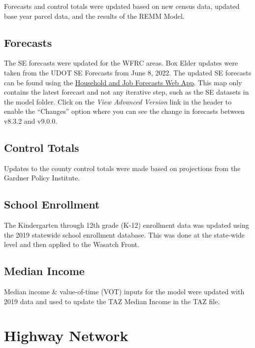\documentclass[
  letterpaper,
  DIV=11,
  numbers=noendperiod,
  titlepage=false]{scrreprt}
\begin{document}
Forecasts and control totals were updated based on new census data,
updated base year parcel data, and the results of the REMM Model.

\hypertarget{forecasts}{%
\subsection{Forecasts}\label{forecasts}}

The SE forecasts were updated for the WFRC areas. Box Elder updates were
taken from the UDOT SE Forecasts from June 8, 2022. The updated SE
forecasts can be found using the
\href{https://wfrc.org/household-job-forecast-map}{Household and Job
Forecasts Web App}. This map only contains the latest forecast and not
any iterative step, such as the SE datasets in the model folder. Click
on the \emph{View Advanced Version} link in the header to enable the
``Changes'' option where you can see the change in forecasts between
v8.3.2 and v9.0.0.

\hypertarget{control-totals}{%
\subsection{Control Totals}\label{control-totals}}

Updates to the county control totals were made based on projections from
the Gardner Policy Institute.

\hypertarget{school-enrollment}{%
\subsection{School Enrollment}\label{school-enrollment}}

The Kindergarten through 12th grade (K-12) enrollment data was updated
using the 2019 statewide school enrollment database. This was done at
the state-wide level and then applied to the Wasatch Front.

\hypertarget{median-income}{%
\subsection{Median Income}\label{median-income}}

Median income \& value-of-time (VOT) inputs for the model were updated
with 2019 data and used to update the TAZ Median Income in the TAZ file.

\hypertarget{highway-network}{%
\section{Highway Network}\label{highway-network}}
\end{document}
